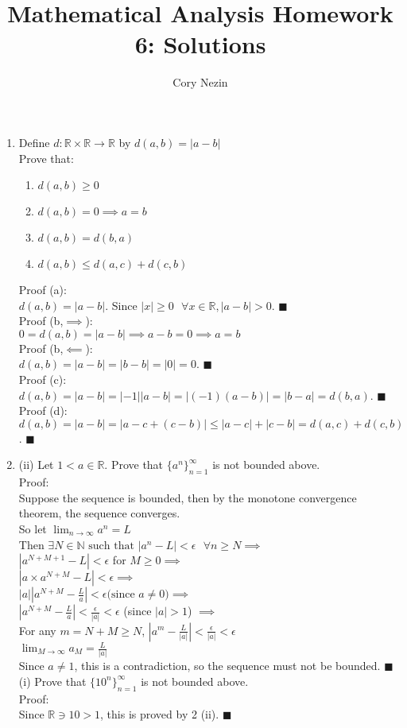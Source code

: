 \documentclass[12pt]{article}
\title{Mathematical Analysis Homework 6: Solutions}
\author{Cory Nezin}
\begin{document}
\maketitle
\begin{enumerate}
\item Define $d: \mathbb{R} \times \mathbb{R} \rightarrow \mathbb{R}$ by $d(a,b) = |a-b|$\\
Prove that:
\begin{enumerate}
\item $d(a,b) \geq 0$
\item $d(a,b) = 0 \implies a = b$
\item $d(a,b) = d(b,a)$
\item $d(a,b) \leq d(a,c) + d(c,b)$
\end{enumerate}
Proof (a):\\
$d(a,b) = |a-b|$.  Since $|x| \geq 0\text{ }\forall x\in\mathbb{R}, |a-b|>0$. $\blacksquare$\\
Proof (b,$\implies$):\\
$0 = d(a,b) = |a-b| \implies a-b = 0\implies a=b$\\
Proof (b,$\impliedby$):\\
$d(a,b) = |a-b| = |b-b| = |0| = 0$. $\blacksquare$\\
Proof (c):\\
$d(a,b) = |a-b| = |-1||a-b| = |(-1)(a-b)| = |b-a| = d(b,a)$. $\blacksquare$\\
Proof (d):\\
$d(a,b) = |a-b| = |a-c+(c-b)| \leq |a-c| + |c-b| = d(a,c) + d(c,b)$. $\blacksquare$
\item (ii) Let $1 < a \in \mathbb{R}$.  Prove that $\{a^n\}_{n=1}^\infty$ is not bounded above.\\
Proof:\\
Suppose the sequence is bounded, then by the monotone convergence theorem, the sequence converges.\\
So let $\lim_{n\to\infty}a^n = L$\\
Then $\exists N\in\mathbb{N} \text{ such that } |a^n-L| < \epsilon \text{ } \forall n \geq N \implies$\\
$|a^{N+M+1}-L| < \epsilon$ for $M \geq 0\implies$\\
$|a\times a^{N+M}-L| < \epsilon\implies$\\
$|a||a^{N+M}-\frac{L}{a}| < \epsilon \text{(since $a \neq 0$)}\implies$\\
$|a^{N+M} - \frac{L}{a}| < \frac{\epsilon}{|a|} < \epsilon$ (since $|a| > 1$) $\implies$\\
For any $m = N + M \geq N$, $|a^{m} - \frac{L}{|a|}| < \frac{\epsilon}{|a|} < \epsilon$\\
$\lim_{M\to\infty}a_M = \frac{L}{|a|}$\\
Since $a\neq 1$, this is a contradiction, so the sequence must not be bounded. $\blacksquare$\\
(i) Prove that $\{10^n\}_{n=1}^\infty$ is not bounded above.\\
Proof:\\
Since $\mathbb{R} \ni 10 > 1$, this is proved by 2 (ii). $\blacksquare$

\end{enumerate}
\end{document}
